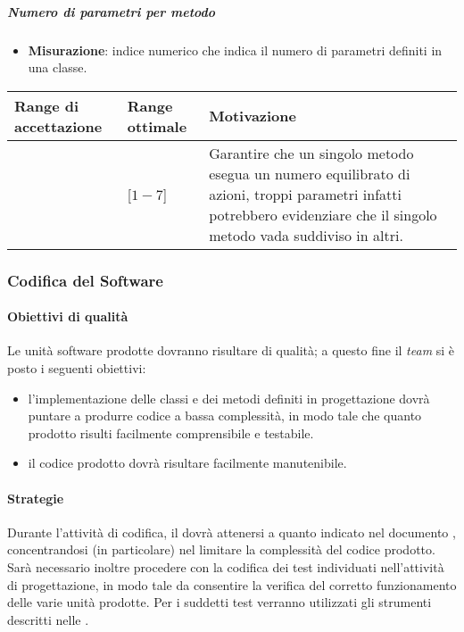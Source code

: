 \subparagraph{Numero di parametri per metodo}

\begin{itemize}
\item \textbf{Misurazione}: indice numerico che indica il numero di parametri definiti in una classe.
\end{itemize}


\begin{center}
\begin{tabular}{|P{2.5cm}|P{2.5cm}|P{6cm}|}
		\hline
			\textbf{Range di accettazione}	& \textbf{Range ottimale} & \textbf{Motivazione} \\
			\hline
			[$1 - 15$] & [$1 - 7$] &	Garantire che un singolo metodo esegua un numero equilibrato di azioni, troppi parametri infatti potrebbero evidenziare che il singolo metodo vada suddiviso in altri. \\
			\hline
			\end{tabular}
\end{center}

\subsubsection{Codifica del Software}

\paragraph{Obiettivi di qualità}
Le unità software prodotte dovranno risultare di qualità; a questo fine il \textit{team} si è posto i seguenti obiettivi:
\begin{itemize}
\item l'implementazione delle classi e dei metodi definiti in progettazione dovrà puntare a produrre codice a bassa complessità, in modo tale che quanto prodotto risulti facilmente comprensibile e testabile.
\item il codice prodotto dovrà risultare facilmente manutenibile.
\end{itemize}

\paragraph{Strategie}
Durante l'attività di codifica, il \textit{\Progr} dovrà attenersi a quanto indicato nel documento \textit{\DDP}, concentrandosi (in particolare) nel limitare la complessità del codice prodotto. Sarà necessario inoltre procedere con la codifica dei test individuati nell'attività di progettazione, in modo tale da consentire la verifica del corretto funzionamento delle varie unità prodotte. Per i suddetti test verranno utilizzati gli strumenti descritti nelle \NdP.

